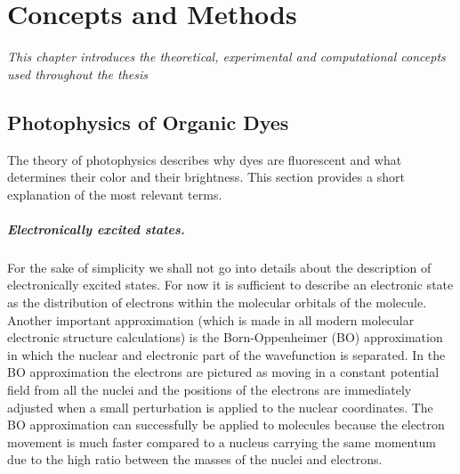 \chapter{Concepts and Methods}
\label{chap:Methodologies}
\textit{This chapter introduces the theoretical, experimental and computational concepts used throughout the thesis}
\vspace{2ex}\vfill
\minitoc
\newpage

\section{Photophysics of Organic Dyes}
 The theory of photophysics describes why dyes are fluorescent and what determines their color and their brightness. This section provides a short explanation of the most relevant terms.

 \paragraph{Electronically excited states.} For the sake of simplicity we shall not go into details about the description of electronically excited states. For now it is sufficient to describe an electronic state as the distribution of electrons within the molecular orbitals of the molecule. Another important approximation (which is made in all modern molecular electronic structure calculations) is the Born-Oppenheimer (BO) approximation in which the nuclear and electronic part of the wavefunction is separated.\cite{Born1927} In the BO approximation the electrons are pictured as moving in a constant potential field from all the nuclei and the positions of the electrons are immediately adjusted when a small perturbation is applied to the nuclear coordinates. The BO approximation can successfully be applied to molecules because the electron movement is much faster compared to a nucleus carrying the same momentum due to the high ratio between the masses of the nuclei and electrons.

